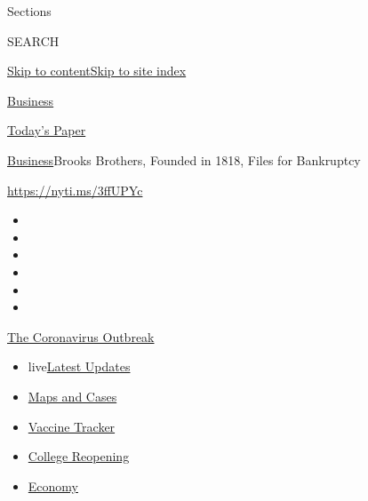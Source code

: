 Sections

SEARCH

\protect\hyperlink{site-content}{Skip to
content}\protect\hyperlink{site-index}{Skip to site index}

\href{https://www.nytimes3xbfgragh.onion/section/business}{Business}

\href{https://myaccount.nytimes3xbfgragh.onion/auth/login?response_type=cookie\&client_id=vi}{}

\href{https://www.nytimes3xbfgragh.onion/section/todayspaper}{Today's
Paper}

\href{/section/business}{Business}\textbar{}Brooks Brothers, Founded in
1818, Files for Bankruptcy

\url{https://nyti.ms/3ffUPYc}

\begin{itemize}
\item
\item
\item
\item
\item
\item
\end{itemize}

\href{https://www.nytimes3xbfgragh.onion/news-event/coronavirus?action=click\&pgtype=Article\&state=default\&region=TOP_BANNER\&context=storylines_menu}{The
Coronavirus Outbreak}

\begin{itemize}
\tightlist
\item
  live\href{https://www.nytimes3xbfgragh.onion/2020/08/03/world/coronavirus-covid-19.html?action=click\&pgtype=Article\&state=default\&region=TOP_BANNER\&context=storylines_menu}{Latest
  Updates}
\item
  \href{https://www.nytimes3xbfgragh.onion/interactive/2020/us/coronavirus-us-cases.html?action=click\&pgtype=Article\&state=default\&region=TOP_BANNER\&context=storylines_menu}{Maps
  and Cases}
\item
  \href{https://www.nytimes3xbfgragh.onion/interactive/2020/science/coronavirus-vaccine-tracker.html?action=click\&pgtype=Article\&state=default\&region=TOP_BANNER\&context=storylines_menu}{Vaccine
  Tracker}
\item
  \href{https://www.nytimes3xbfgragh.onion/2020/08/02/us/covid-college-reopening.html?action=click\&pgtype=Article\&state=default\&region=TOP_BANNER\&context=storylines_menu}{College
  Reopening}
\item
  \href{https://www.nytimes3xbfgragh.onion/live/2020/08/03/business/stock-market-today-coronavirus?action=click\&pgtype=Article\&state=default\&region=TOP_BANNER\&context=storylines_menu}{Economy}
\end{itemize}

